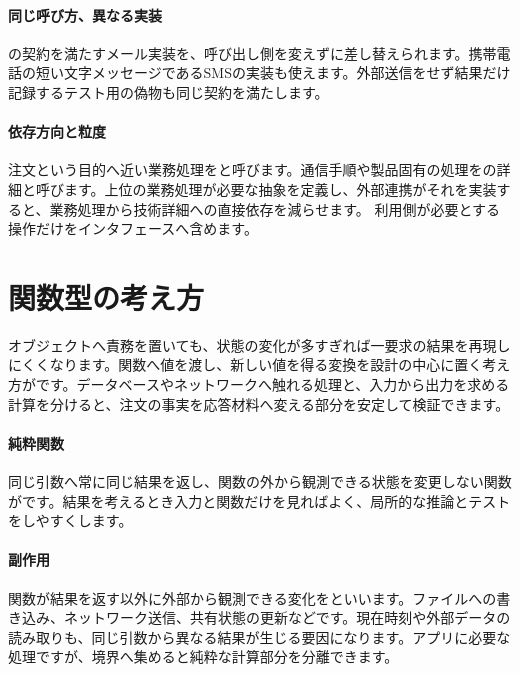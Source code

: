 \paragraph{同じ呼び方、異なる実装}
        の契約を満たすメール実装を、呼び出し側を変えずに差し替えられます。携帯電話の短い文字メッセージであるSMSの実装も使えます。外部送信をせず結果だけ記録するテスト用の偽物も同じ契約を満たします。

\paragraph{依存方向と粒度}
        注文という目的へ近い業務処理をと呼びます。通信手順や製品固有の処理をの詳細と呼びます。上位の業務処理が必要な抽象を定義し、外部連携がそれを実装すると、業務処理から技術詳細への直接依存を減らせます。
        利用側が必要とする操作だけをインタフェースへ含めます。

\par
\endgroup
\par
\endgroup


\section{関数型の考え方}
\label{sec:04-software-engineering-15}

オブジェクトへ責務を置いても、状態の変化が多すぎれば一要求の結果を再現しにくくなります。関数へ値を渡し、新しい値を得る変換を設計の中心に置く考え方がです。データベースやネットワークへ触れる処理と、入力から出力を求める計算を分けると、注文の事実を応答材料へ変える部分を安定して検証できます。

\begingroup
\begingroup
\paragraph{純粋関数}
        同じ引数へ常に同じ結果を返し、関数の外から観測できる状態を変更しない関数がです。結果を考えるとき入力と関数だけを見ればよく、局所的な推論とテストをしやすくします。

\paragraph{副作用}
        関数が結果を返す以外に外部から観測できる変化をといいます。ファイルへの書き込み、ネットワーク送信、共有状態の更新などです。現在時刻や外部データの読み取りも、同じ引数から異なる結果が生じる要因になります。アプリに必要な処理ですが、境界へ集めると純粋な計算部分を分離できます。

